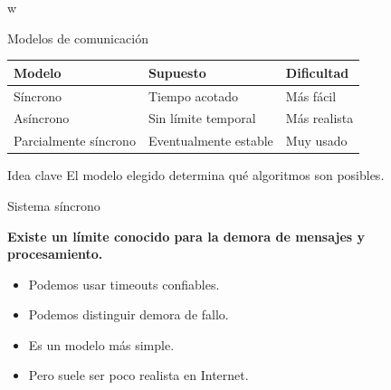 w\documentclass[aspectratio=169]{beamer}
\begin{document}
\begin{frame}{Modelos de comunicación}

\begin{table}
\centering
\begin{tabular}{lll}
\toprule
\textbf{Modelo} & \textbf{Supuesto} & \textbf{Dificultad} \\
\midrule
Síncrono & Tiempo acotado & Más fácil \\
Asíncrono & Sin límite temporal & Más realista \\
Parcialmente síncrono & Eventualmente estable & Muy usado \\
\bottomrule
\end{tabular}
\end{table}

\vspace{0.7cm}

\begin{block}{Idea clave}
El modelo elegido determina qué algoritmos son posibles.
\end{block}

\end{frame}

\begin{frame}{Sistema síncrono}

\Large

\begin{center}
\textbf{Existe un límite conocido para la demora de mensajes y procesamiento.}
\end{center}

\vspace{0.7cm}

\normalsize

\begin{itemize}
    \item Podemos usar timeouts confiables.
    \item Podemos distinguir demora de fallo.
    \item Es un modelo más simple.
    \item Pero suele ser poco realista en Internet.
\end{itemize}

\end{frame}
\end{document}
